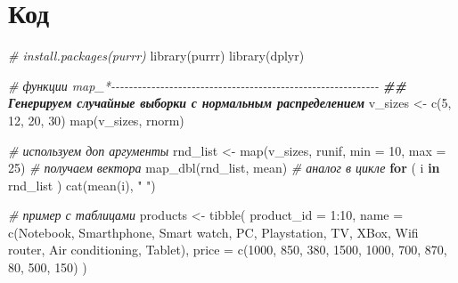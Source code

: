 \documentclass[
]{book}
\newenvironment{Shaded}{\begin{snugshade}}{\end{snugshade}}
\newcommand{\AttributeTok}[1]{\textcolor[rgb]{0.77,0.63,0.00}{#1}}
\newcommand{\CommentTok}[1]{\textcolor[rgb]{0.56,0.35,0.01}{\textit{#1}}}
\newcommand{\ControlFlowTok}[1]{\textcolor[rgb]{0.13,0.29,0.53}{\textbf{#1}}}
\newcommand{\DecValTok}[1]{\textcolor[rgb]{0.00,0.00,0.81}{#1}}
\newcommand{\DocumentationTok}[1]{\textcolor[rgb]{0.56,0.35,0.01}{\textbf{\textit{#1}}}}
\newcommand{\FunctionTok}[1]{\textcolor[rgb]{0.00,0.00,0.00}{#1}}
\newcommand{\NormalTok}[1]{#1}
\newcommand{\OtherTok}[1]{\textcolor[rgb]{0.56,0.35,0.01}{#1}}
\newcommand{\SpecialCharTok}[1]{\textcolor[rgb]{0.00,0.00,0.00}{#1}}
\newcommand{\StringTok}[1]{\textcolor[rgb]{0.31,0.60,0.02}{#1}}
\begin{document}
\hypertarget{ux43aux43eux434-3}{%
\section{Код}\label{ux43aux43eux434-3}}

\begin{Shaded}
\begin{Highlighting}[]
\CommentTok{\# install.packages(\textquotesingle{}purrr\textquotesingle{})}
\FunctionTok{library}\NormalTok{(purrr)}
\FunctionTok{library}\NormalTok{(dplyr)}

\CommentTok{\# функции map\_*{-}{-}{-}{-}{-}{-}{-}{-}{-}{-}{-}{-}{-}{-}{-}{-}{-}{-}{-}{-}{-}{-}{-}{-}{-}{-}{-}{-}{-}{-}{-}{-}{-}{-}{-}{-}{-}{-}{-}{-}{-}{-}{-}{-}{-}{-}{-}{-}{-}{-}{-}{-}{-}{-}{-}{-}{-}{-}{-}{-}}
\DocumentationTok{\#\# Генерируем случайные выборки с нормальным распределением}
\NormalTok{v\_sizes }\OtherTok{\textless{}{-}} \FunctionTok{c}\NormalTok{(}\DecValTok{5}\NormalTok{, }\DecValTok{12}\NormalTok{, }\DecValTok{20}\NormalTok{, }\DecValTok{30}\NormalTok{)}
\FunctionTok{map}\NormalTok{(v\_sizes, rnorm)}

\CommentTok{\# используем доп аргументы}
\NormalTok{rnd\_list }\OtherTok{\textless{}{-}} \FunctionTok{map}\NormalTok{(v\_sizes, runif, }\AttributeTok{min =} \DecValTok{10}\NormalTok{, }\AttributeTok{max =} \DecValTok{25}\NormalTok{)}
\CommentTok{\# получаем вектора}
\FunctionTok{map\_dbl}\NormalTok{(rnd\_list, mean)}
\CommentTok{\# аналог в цикле}
\ControlFlowTok{for}\NormalTok{ ( i }\ControlFlowTok{in}\NormalTok{ rnd\_list ) }\FunctionTok{cat}\NormalTok{(}\FunctionTok{mean}\NormalTok{(i), }\StringTok{" "}\NormalTok{)}

\CommentTok{\# пример с таблицами}
\NormalTok{products }\OtherTok{\textless{}{-}} \FunctionTok{tibble}\NormalTok{(}
  \AttributeTok{product\_id =} \DecValTok{1}\SpecialCharTok{:}\DecValTok{10}\NormalTok{,}
  \AttributeTok{name =} \FunctionTok{c}\NormalTok{(}\StringTok{\textquotesingle{}Notebook\textquotesingle{}}\NormalTok{,}
           \StringTok{\textquotesingle{}Smarthphone\textquotesingle{}}\NormalTok{,}
           \StringTok{\textquotesingle{}Smart watch\textquotesingle{}}\NormalTok{,}
           \StringTok{\textquotesingle{}PC\textquotesingle{}}\NormalTok{,}
           \StringTok{\textquotesingle{}Playstation\textquotesingle{}}\NormalTok{,}
           \StringTok{\textquotesingle{}TV\textquotesingle{}}\NormalTok{,}
           \StringTok{\textquotesingle{}XBox\textquotesingle{}}\NormalTok{,}
           \StringTok{\textquotesingle{}Wifi router\textquotesingle{}}\NormalTok{,}
           \StringTok{\textquotesingle{}Air conditioning\textquotesingle{}}\NormalTok{,}
           \StringTok{\textquotesingle{}Tablet\textquotesingle{}}\NormalTok{),}
  \AttributeTok{price =} \FunctionTok{c}\NormalTok{(}\DecValTok{1000}\NormalTok{, }\DecValTok{850}\NormalTok{, }\DecValTok{380}\NormalTok{, }\DecValTok{1500}\NormalTok{, }\DecValTok{1000}\NormalTok{, }\DecValTok{700}\NormalTok{, }\DecValTok{870}\NormalTok{, }\DecValTok{80}\NormalTok{, }\DecValTok{500}\NormalTok{, }\DecValTok{150}\NormalTok{)}
\NormalTok{)}


\end{Highlighting}
\end{Shaded}
\end{document}
